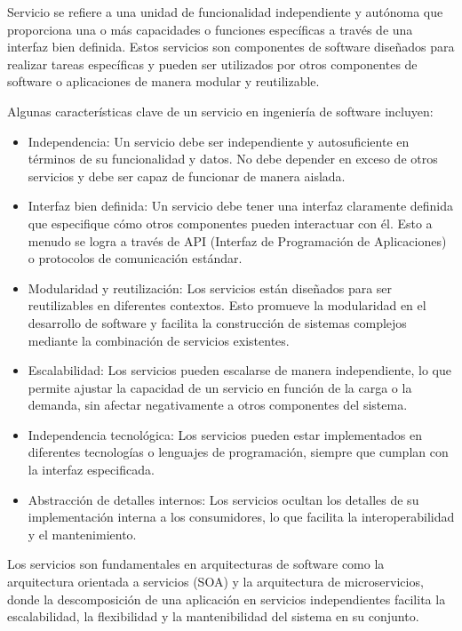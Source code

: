 Servicio se refiere a una unidad de funcionalidad independiente y autónoma que proporciona una o más capacidades o funciones específicas a través de una interfaz bien definida. Estos servicios son componentes de software diseñados para realizar tareas específicas y pueden ser utilizados por otros componentes de software o aplicaciones de manera modular y reutilizable.

Algunas características clave de un servicio en ingeniería de software incluyen:
\begin{itemize}
    \item Independencia: Un servicio debe ser independiente y autosuficiente en términos de su funcionalidad y datos. No debe depender en exceso de otros servicios y debe ser capaz de funcionar de manera aislada.
    \item Interfaz bien definida: Un servicio debe tener una interfaz claramente definida que especifique cómo otros componentes pueden interactuar con él. Esto a menudo se logra a través de API (Interfaz de Programación de Aplicaciones) o protocolos de comunicación estándar.
    \item Modularidad y reutilización: Los servicios están diseñados para ser reutilizables en diferentes contextos. Esto promueve la modularidad en el desarrollo de software y facilita la construcción de sistemas complejos mediante la combinación de servicios existentes.
    \item Escalabilidad: Los servicios pueden escalarse de manera independiente, lo que permite ajustar la capacidad de un servicio en función de la carga o la demanda, sin afectar negativamente a otros componentes del sistema.
    \item Independencia tecnológica: Los servicios pueden estar implementados en diferentes tecnologías o lenguajes de programación, siempre que cumplan con la interfaz especificada.
    \item Abstracción de detalles internos: Los servicios ocultan los detalles de su implementación interna a los consumidores, lo que facilita la interoperabilidad y el mantenimiento.
\end{itemize}

Los servicios son fundamentales en arquitecturas de software como la arquitectura orientada a servicios (SOA) y la arquitectura de microservicios, donde la descomposición de una aplicación en servicios independientes facilita la escalabilidad, la flexibilidad y la mantenibilidad del sistema en su conjunto.


